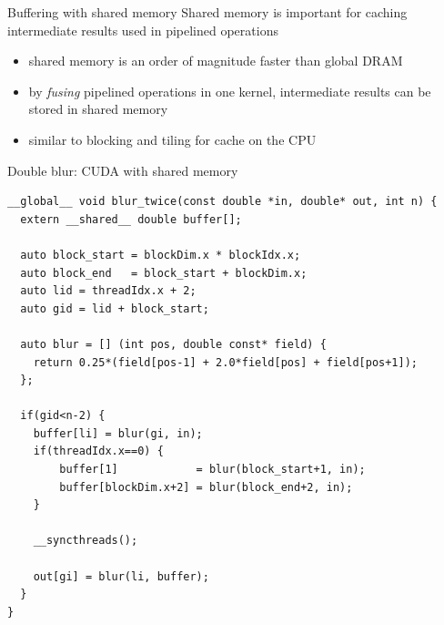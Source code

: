 \begin{frame}[fragile]{}
    \begin{info}{Buffering with shared memory}
        Shared memory is important for caching intermediate results used in pipelined operations
        \begin{itemize}
            \item shared memory is an order of magnitude faster than global DRAM
            \item by \emph{fusing} pipelined operations in one kernel, intermediate results can be stored in shared memory
            \item similar to blocking and tiling for cache on the CPU
        \end{itemize}
    \end{info}

\end{frame}


\begin{frame}[fragile]{}
    \begin{code}{Double blur: CUDA with shared memory}
        \begin{lstlisting}[style=boxcudatiny]
__global__ void blur_twice(const double *in, double* out, int n) {
  extern __shared__ double buffer[];

  auto block_start = blockDim.x * blockIdx.x;
  auto block_end   = block_start + blockDim.x;
  auto lid = threadIdx.x + 2;
  auto gid = lid + block_start;

  auto blur = [] (int pos, double const* field) {
    return 0.25*(field[pos-1] + 2.0*field[pos] + field[pos+1]);
  };

  if(gid<n-2) {
    buffer[li] = blur(gi, in);
    if(threadIdx.x==0) {
        buffer[1]            = blur(block_start+1, in);
        buffer[blockDim.x+2] = blur(block_end+2, in);
    }

    __syncthreads();

    out[gi] = blur(li, buffer);
  }
}
        \end{lstlisting}
    \end{code}
\end{frame}

